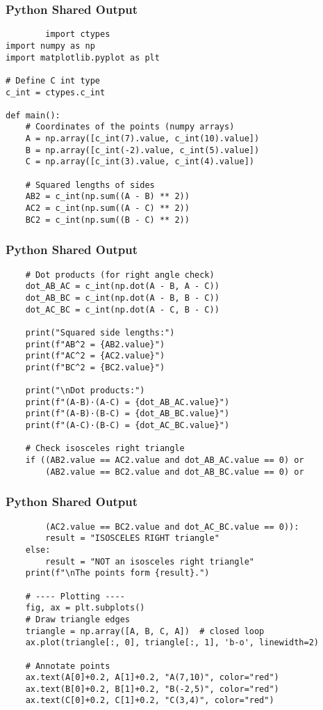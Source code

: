\documentclass{beamer}
\begin{document}
 \begin{frame}[fragile]
		\frametitle{Python Shared Output}
		\begin{lstlisting}
        import ctypes
import numpy as np
import matplotlib.pyplot as plt

# Define C int type
c_int = ctypes.c_int

def main():
    # Coordinates of the points (numpy arrays)
    A = np.array([c_int(7).value, c_int(10).value])
    B = np.array([c_int(-2).value, c_int(5).value])
    C = np.array([c_int(3).value, c_int(4).value])

    # Squared lengths of sides
    AB2 = c_int(np.sum((A - B) ** 2))
    AC2 = c_int(np.sum((A - C) ** 2))
    BC2 = c_int(np.sum((B - C) ** 2))
  \end{lstlisting}
\end{frame}

 \begin{frame}[fragile]
		\frametitle{Python Shared Output}
		\begin{lstlisting}
    # Dot products (for right angle check)
    dot_AB_AC = c_int(np.dot(A - B, A - C))
    dot_AB_BC = c_int(np.dot(A - B, B - C))
    dot_AC_BC = c_int(np.dot(A - C, B - C))

    print("Squared side lengths:")
    print(f"AB^2 = {AB2.value}")
    print(f"AC^2 = {AC2.value}")
    print(f"BC^2 = {BC2.value}")

    print("\nDot products:")
    print(f"(A-B)·(A-C) = {dot_AB_AC.value}")
    print(f"(A-B)·(B-C) = {dot_AB_BC.value}")
    print(f"(A-C)·(B-C) = {dot_AC_BC.value}")

    # Check isosceles right triangle
    if ((AB2.value == AC2.value and dot_AB_AC.value == 0) or
        (AB2.value == BC2.value and dot_AB_BC.value == 0) or
          \end{lstlisting}
\end{frame}

 \begin{frame}[fragile]
		\frametitle{Python Shared Output}
		\begin{lstlisting}
        (AC2.value == BC2.value and dot_AC_BC.value == 0)):
        result = "ISOSCELES RIGHT triangle"
    else:
        result = "NOT an isosceles right triangle"
    print(f"\nThe points form {result}.")

    # ---- Plotting ----
    fig, ax = plt.subplots()
    # Draw triangle edges
    triangle = np.array([A, B, C, A])  # closed loop
    ax.plot(triangle[:, 0], triangle[:, 1], 'b-o', linewidth=2)

    # Annotate points
    ax.text(A[0]+0.2, A[1]+0.2, "A(7,10)", color="red")
    ax.text(B[0]+0.2, B[1]+0.2, "B(-2,5)", color="red")
    ax.text(C[0]+0.2, C[1]+0.2, "C(3,4)", color="red")
  \end{lstlisting}
\end{frame}
\end{document}
